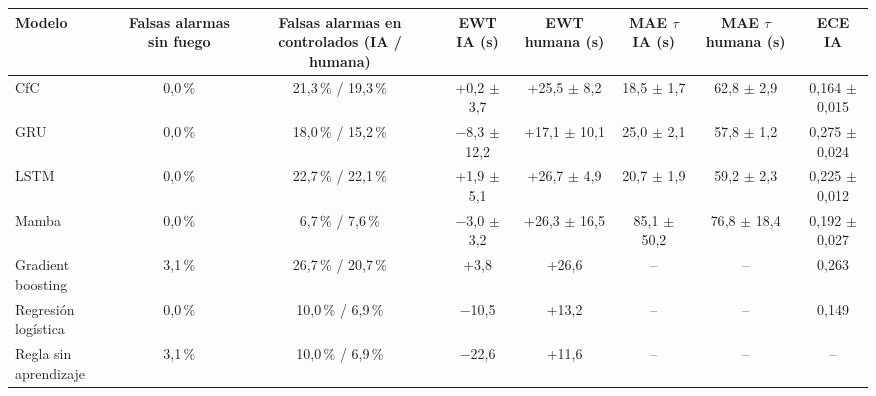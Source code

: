 \begin{tabular}{|l|c|c|c|c|c|c|c|}
\hline
\textbf{Modelo} & \textbf{Falsas alarmas sin fuego} & \textbf{Falsas alarmas en controlados (IA / humana)} & \textbf{EWT IA (s)} & \textbf{EWT humana (s)} & \textbf{MAE $\tau$ IA (s)} & \textbf{MAE $\tau$ humana (s)} & \textbf{ECE IA} \\ \hline
CfC & 0{,}0\,\% & 21{,}3\,\% / 19{,}3\,\% & +0{,}2 $\pm$ 3{,}7 & +25{,}5 $\pm$ 8{,}2 & 18{,}5 $\pm$ 1{,}7 & 62{,}8 $\pm$ 2{,}9 & 0{,}164 $\pm$ 0{,}015 \\ \hline
GRU & 0{,}0\,\% & 18{,}0\,\% / 15{,}2\,\% & $-$8{,}3 $\pm$ 12{,}2 & +17{,}1 $\pm$ 10{,}1 & 25{,}0 $\pm$ 2{,}1 & 57{,}8 $\pm$ 1{,}2 & 0{,}275 $\pm$ 0{,}024 \\ \hline
LSTM & 0{,}0\,\% & 22{,}7\,\% / 22{,}1\,\% & +1{,}9 $\pm$ 5{,}1 & +26{,}7 $\pm$ 4{,}9 & 20{,}7 $\pm$ 1{,}9 & 59{,}2 $\pm$ 2{,}3 & 0{,}225 $\pm$ 0{,}012 \\ \hline
Mamba & 0{,}0\,\% & 6{,}7\,\% / 7{,}6\,\% & $-$3{,}0 $\pm$ 3{,}2 & +26{,}3 $\pm$ 16{,}5 & 85{,}1 $\pm$ 50{,}2 & 76{,}8 $\pm$ 18{,}4 & 0{,}192 $\pm$ 0{,}027 \\ \hline
Gradient boosting & 3{,}1\,\% & 26{,}7\,\% / 20{,}7\,\% & +3{,}8 & +26{,}6 & -- & -- & 0{,}263 \\ \hline
Regresión logística & 0{,}0\,\% & 10{,}0\,\% / 6{,}9\,\% & $-$10{,}5 & +13{,}2 & -- & -- & 0{,}149 \\ \hline
Regla sin aprendizaje & 3{,}1\,\% & 10{,}0\,\% / 6{,}9\,\% & $-$22{,}6 & +11{,}6 & -- & -- & -- \\ \hline
\end{tabular}
